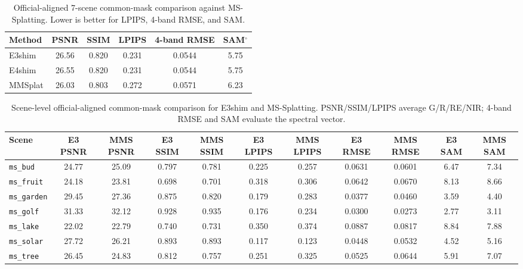 \begin{table}[t]
    \caption{Official-aligned 7-scene common-mask comparison against MS-Splatting. Lower is better for LPIPS, 4-band RMSE, and SAM.}
    \label{tab:mms-official7}
    \centering
    \small
    \begin{tabular}{lccccc}
        \toprule
        Method & PSNR & SSIM & LPIPS & 4-band RMSE & SAM$^\circ$ \\
        \midrule
        E3shim & 26.56 & 0.820 & 0.231 & 0.0544 & 5.75 \\
        E4shim & 26.55 & 0.820 & 0.231 & 0.0544 & 5.75 \\
        MMSplat & 26.03 & 0.803 & 0.272 & 0.0571 & 6.23 \\
        \bottomrule
    \end{tabular}
\end{table}

\begin{table}[t]
    \caption{Scene-level official-aligned common-mask comparison for E3shim and MS-Splatting. PSNR/SSIM/LPIPS average G/R/RE/NIR; 4-band RMSE and SAM evaluate the spectral vector.}
    \label{tab:mms-scenes}
    \centering
    \scriptsize
    \setlength{\tabcolsep}{3pt}
    \begin{tabular}{lcccccccccc}
        \toprule
        Scene & E3 PSNR & MMS PSNR & E3 SSIM & MMS SSIM & E3 LPIPS & MMS LPIPS & E3 RMSE & MMS RMSE & E3 SAM & MMS SAM \\
        \midrule
        \texttt{ms\_bud} & 24.77 & 25.09 & 0.797 & 0.781 & 0.225 & 0.257 & 0.0631 & 0.0601 & 6.47 & 7.34 \\
        \texttt{ms\_fruit} & 24.18 & 23.81 & 0.698 & 0.701 & 0.318 & 0.306 & 0.0642 & 0.0670 & 8.13 & 8.66 \\
        \texttt{ms\_garden} & 29.45 & 27.36 & 0.875 & 0.820 & 0.179 & 0.283 & 0.0377 & 0.0460 & 3.59 & 4.40 \\
        \texttt{ms\_golf} & 31.33 & 32.12 & 0.928 & 0.935 & 0.176 & 0.234 & 0.0300 & 0.0273 & 2.77 & 3.11 \\
        \texttt{ms\_lake} & 22.02 & 22.79 & 0.740 & 0.731 & 0.350 & 0.374 & 0.0887 & 0.0817 & 8.84 & 7.88 \\
        \texttt{ms\_solar} & 27.72 & 26.21 & 0.893 & 0.893 & 0.117 & 0.123 & 0.0448 & 0.0532 & 4.52 & 5.16 \\
        \texttt{ms\_tree} & 26.45 & 24.83 & 0.812 & 0.757 & 0.251 & 0.325 & 0.0525 & 0.0644 & 5.91 & 7.07 \\
        \bottomrule
    \end{tabular}
\end{table}


